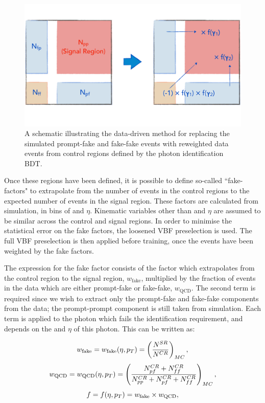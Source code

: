 \begin{figure}
  \centering
  \includegraphics[width=\textwidth]{Figures/Categorisation/DDschematic.pdf}
  \caption[The data-driven method for dijet BDT training.]
  {
    A schematic illustrating the data-driven method for replacing the simulated
    prompt-fake and fake-fake events with reweighted data events from control regions 
    defined by the photon identification BDT. 
  }
  \label{fig:cat_DDschematic}
\end{figure}

Once these regions have been defined, it is possible to define so-called ``fake-factors" 
to extrapolate from the number of events in the control regions 
to the expected number of events in the signal region.
These factors are calculated from simulation, in bins of \pt and $\eta$.
Kinematic variables other than \pt and $\eta$ are assumed to be similar 
across the control and signal regions.
In order to minimise the statistical error on the fake factors, 
the loosened VBF preselection is used.
The full VBF preselection is then applied before training, 
once the events have been weighted by the fake factors.

The expression for the fake factor consists of the factor 
which extrapolates from the control region to the signal region, $w_{\textrm{fake}}$, 
multiplied by the fraction of events in the data which are either prompt-fake or fake-fake, 
$w_{\textrm{QCD}}$.
The second term is required since we wish to extract 
only the prompt-fake and fake-fake components from the data;
the prompt-prompt component is still taken from simulation.
Each term is applied to the photon which fails the identification requirement, 
and depends on the \pt and $\eta$ of this photon.
This can be written as:

\begin{equation*}
w_{\textrm{fake}} = w_{\textrm{fake}}(\eta,p_T)
= \left( \frac{N^{SR}} {N^{CR}} \right)_{MC} , 
\end{equation*}
\begin{equation*}
w_{\textrm{QCD}} = w_{\textrm{QCD}}(\eta,p_T)
= \left( \frac{N^{CR}_{pf} + N^{CR}_{ff}} {N^{CR}_{pp} + N^{CR}_{pf} + N^{CR}_{ff}} \right)_{MC} ,
\end{equation*}
\begin{equation*}
f = f(\eta,p_T) = w_{\textrm{fake}} \times w_{\textrm{QCD}} , 
\end{equation*}

